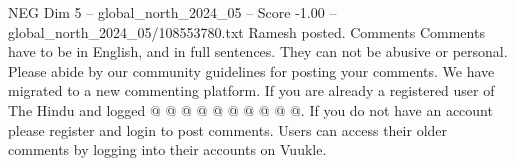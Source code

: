 \begin{textsample}{NEG Dim 5 – global\_north\_2024\_05 – Score -1.00 – global\_north\_2024\_05/108553780.txt}
Ramesh posted.
Comments Comments have to be in English, and in full sentences.
They can not be abusive or personal.
Please abide by our community guidelines for posting your comments.
We have migrated to a new commenting platform.
If you are already a registered user of The Hindu and logged @ @ @ @ @ @ @ @ @ @.
If you do not have an account please register and login to post comments.
Users can access their older comments by logging into their accounts on Vuukle.

\end{textsample}
